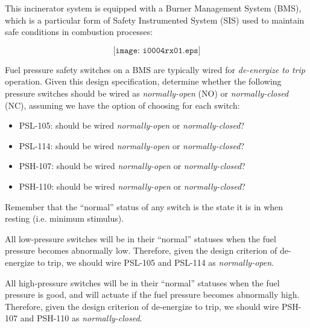 

This incinerator system is equipped with a Burner Management System (BMS), which is a particular form of Safety Instrumented System (SIS) used to maintain safe conditions in combustion processes:

$$\texttt{[image: i0004rx01.eps]}$$

Fuel pressure safety switches on a BMS are typically wired for {\it de-energize to trip} operation.  Given this design specification, determine whether the following pressure switches should be wired as {\it normally-open} (NO) or {\it normally-closed} (NC), assuming we have the option of choosing for each switch:

\begin{itemize}
\item{} PSL-105: should be wired {\it normally-open} or {\it normally-closed}?
\vskip 10pt
\item{} PSL-114: should be wired {\it normally-open} or {\it normally-closed}?
\vskip 10pt
\item{} PSH-107: should be wired {\it normally-open} or {\it normally-closed}?
\vskip 10pt
\item{} PSH-110: should be wired {\it normally-open} or {\it normally-closed}?
\end{itemize}

Remember that the ``normal'' status of any switch is the state it is in when resting (i.e. minimum stimulus).














All low-pressure switches will be in their ``normal'' statuses when the fuel pressure becomes abnormally low.  Therefore, given the design criterion of de-energize to trip, we should wire PSL-105 and PSL-114 as {\it normally-open}.

\vskip 10pt

All high-pressure switches will be in their ``normal'' statuses when the fuel pressure is good, and will actuate if the fuel pressure becomes abnormally high.  Therefore, given the design criterion of de-energize to trip, we should wire PSH-107 and PSH-110 as {\it normally-closed}.





